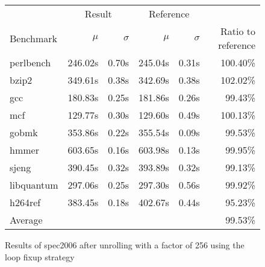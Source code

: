 \begin{figure}[h]
    \begin{center}
        \begin{tabular}{lrrrrr}
            \toprule
            & \multicolumn{2}{c}{Result} & \multicolumn{2}{c}{Reference}\\
            Benchmark & $\mu$ & $\sigma$ & $\mu$ & $\sigma$ & Ratio to reference\\
            \midrule
            perlbench & 246.02s & 0.70s & 245.04s & 0.31s & 100.40\%\\
            bzip2 & 349.61s & 0.38s & 342.69s & 0.38s & 102.02\%\\
            gcc & 180.83s & 0.25s & 181.86s & 0.26s & 99.43\%\\
            mcf & 129.77s & 0.30s & 129.60s & 0.49s & 100.13\%\\
            gobmk & 353.86s & 0.22s & 355.54s & 0.09s & 99.53\%\\
            hmmer & 603.65s & 0.16s & 603.98s & 0.13s & 99.95\%\\
            sjeng & 390.45s & 0.32s & 393.89s & 0.32s & 99.13\%\\
            libquantum & 297.06s & 0.25s & 297.30s & 0.56s & 99.92\%\\
            h264ref & 383.45s & 0.18s & 402.67s & 0.44s & 95.23\%\\
            \midrule
            Average & & & & & 99.53\%\\
            \bottomrule
        \end{tabular}
    \end{center}
    \caption{Results of spec2006 after unrolling with a factor of 256 using the loop fixup strategy}
    \label{fig:eval:perf:loop:256}
\end{figure}
